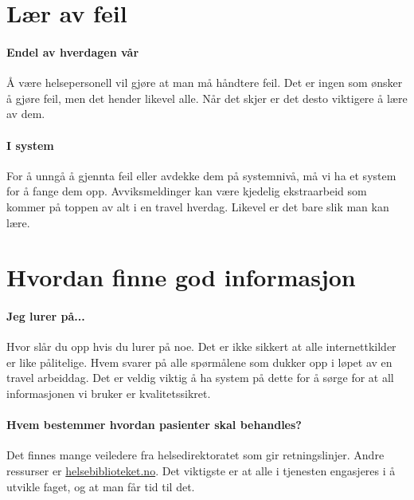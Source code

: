 		\section{Lær av feil}
			\paragraph{Endel av hverdagen vår\\}
				Å være helsepersonell vil gjøre at man må håndtere feil. Det er ingen som ønsker å gjøre feil, men det hender likevel alle. Når det skjer er det desto viktigere å lære av dem.
			\paragraph{I system\\}
				For å unngå å gjennta feil eller avdekke dem på systemnivå, må vi ha et system for å fange dem opp. Avviksmeldinger kan være kjedelig ekstraarbeid som kommer på toppen av alt i en travel hverdag. Likevel er det bare slik man kan lære.
		\section{Hvordan finne god informasjon}
			\paragraph{Jeg lurer på...\\}
				Hvor slår du opp hvis du lurer på noe. Det er ikke sikkert at alle internettkilder er like pålitelige. Hvem svarer på alle spørmålene som dukker opp i løpet av en travel arbeiddag. Det er veldig viktig å ha system på dette for å sørge for at all informasjonen vi bruker er kvalitetssikret. 
			\paragraph{Hvem bestemmer hvordan pasienter skal behandles?\\}
				Det finnes mange veiledere fra helsedirektoratet som gir retningslinjer. Andre ressurser er \href{http://www.helsebiblioteket.no/}{helsebiblioteket.no}. Det viktigste er at alle i tjenesten engasjeres i å utvikle faget, og at man får tid til det. 
